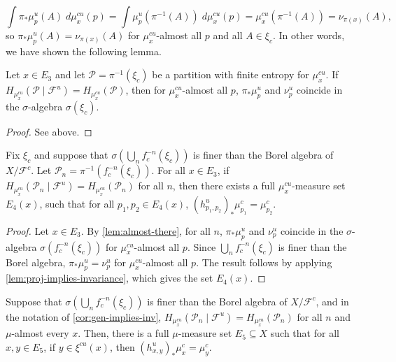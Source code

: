 \documentclass[../main]{subfiles}
\begin{document}
\begin{equation*}
  \int \pi_*\mu_p^{u}(A) \;d\mu_x^{cu}(p) =
  \int \mu_p^{u}(\pi ^{-1}(A)) \;d\mu_x^{cu}(p) =
  \mu_x^{cu}(\pi ^{-1}(A)) = \nu_{\pi(x)}(A),
\end{equation*}
so \(\pi_*\mu_p^{u}(A) = \nu_{\pi(x)}(A)\) for \(\mu^{cu}_x\)-almost all \(p\) and all \(A \in \xi_c\).
In other words, we have shown the following lemma.

\begin{lemma}\label{lem:almost-there}
  Let \(x \in E_3\) and let \(\mathcal{P} = \pi ^{-1}(\xi_c)\) be a partition with finite entropy for \(\mu^{cu}_x\). If \(H_{\mu_x^{cu}}(\mathcal{P}\mid \mathcal{F}^u) = H_{\mu_x^{cu}}(\mathcal{P})\), then for \(\mu^{cu}_x\)-almost all \(p\), \(\pi_*\mu^u_p\) and \(\nu^u_p\) coincide in the \(\sigma\)-algebra \(\sigma(\xi_c)\).
\end{lemma}

\begin{proof}
  See above.
\end{proof}

\begin{lemma}\label{cor:gen-implies-inv}
  Fix \(\xi_c\) and suppose that \(\sigma(\bigcup_n f_c^{-n}(\xi_c))\) is finer than the Borel algebra of \(X/\mathcal{F}^c\). Let \(\mathcal{P}_n = \pi ^{-1}(f_c^{-n}(\xi_c))\). For all \(x \in E_3\), if \(H_{\mu_x^{cu}}(\mathcal{P}_n\mid \mathcal{F}^u) = H_{\mu_x^{cu}}(\mathcal{P}_n)\) for all \(n\), then there exists a full \(\mu_x^{cu}\)-measure set \(E_4(x)\), such that for all \(p_1, p_2 \in E_4(x)\), \((h^u_{p_1,p_2})_*\mu^c_{p_1} = \mu^c_{p_2}\).
\end{lemma}

\begin{proof}
  Let \(x \in E_3\). By \cref{lem:almost-there}, for all \(n\), \(\pi_*\mu^u_p\) and \(\nu^u_p\) coincide in the \(\sigma\)-algebra \(\sigma(f_c^{-n}(\xi_c))\) for \(\mu^{cu}_x\)-almost all \(p\). Since \(\bigcup_n f_c^{-n}(\xi_c)\) is finer than the Borel algebra, \(\pi_*\mu^u_p = \nu^u_p\) for \(\mu^{cu}_x\)-almost all \(p\). The result follows by applying \cref{lem:proj-implies-invariance}, which gives the set \(E_4(x)\).
\end{proof}

\begin{lemma}\label{cor:gen-implies-inv-ae}
  Suppose that \(\sigma(\bigcup_n f_c^{-n}(\xi_c))\) is finer than the Borel algebra of \(X/\mathcal{F}^c\), and in the notation of \cref{cor:gen-implies-inv},  \(H_{\mu_x^{cu}}(\mathcal{P}_n\mid \mathcal{F}^u) = H_{\mu_x^{cu}}(\mathcal{P}_n)\) for all \(n\) and \(\mu\)-almost every \(x\). Then, there is a full \(\mu\)-measure set \(E_5 \subseteq X\) such that for all \(x,y \in E_5\), if \(y \in \xi^{cu}(x)\), then \((h^u_{x,y})_*\mu^c_x = \mu^c_y\).
\end{lemma}
\end{document}
